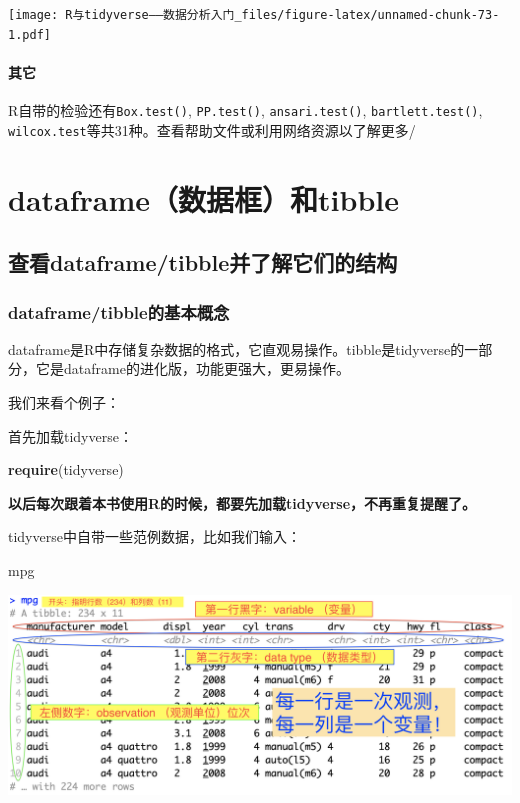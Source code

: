 \documentclass[]{book}
\newenvironment{Shaded}{\begin{snugshade}}{\end{snugshade}}
\newcommand{\KeywordTok}[1]{\textcolor[rgb]{0.13,0.29,0.53}{\textbf{#1}}}
\newcommand{\NormalTok}[1]{#1}
\begin{document}
\texttt{[image: R与tidyverse——数据分析入门\_files/figure-latex/unnamed-chunk-73-1.pdf]}

\hypertarget{-1}{%
\subsubsection{其它}\label{-1}}

R自带的检验还有\texttt{Box.test()}, \texttt{PP.test()}, \texttt{ansari.test()}, \texttt{bartlett.test()}, \texttt{wilcox.test}等共31种。查看帮助文件或利用网络资源以了解更多/

\hypertarget{tibble}{%
\chapter{dataframe（数据框）和tibble}\label{tibble}}

\hypertarget{dataframetibble}{%
\section{查看dataframe/tibble并了解它们的结构}\label{dataframetibble}}

\hypertarget{dataframetibble}{%
\subsection{dataframe/tibble的基本概念}\label{dataframetibble}}

dataframe是R中存储复杂数据的格式，它直观易操作。tibble是tidyverse的一部分，它是dataframe的进化版，功能更强大，更易操作。

我们来看个例子：

首先加载tidyverse：

\begin{Shaded}
\begin{Highlighting}[]
\KeywordTok{require}\NormalTok{(tidyverse)}
\end{Highlighting}
\end{Shaded}

\textbf{以后每次跟着本书使用R的时候，都要先加载tidyverse，不再重复提醒了。}

tidyverse中自带一些范例数据，比如我们输入：

\begin{Shaded}
\begin{Highlighting}[]
\NormalTok{mpg}
\end{Highlighting}
\end{Shaded}

\includegraphics[width=35.53in]{img/tibble-intro}
\end{document}
